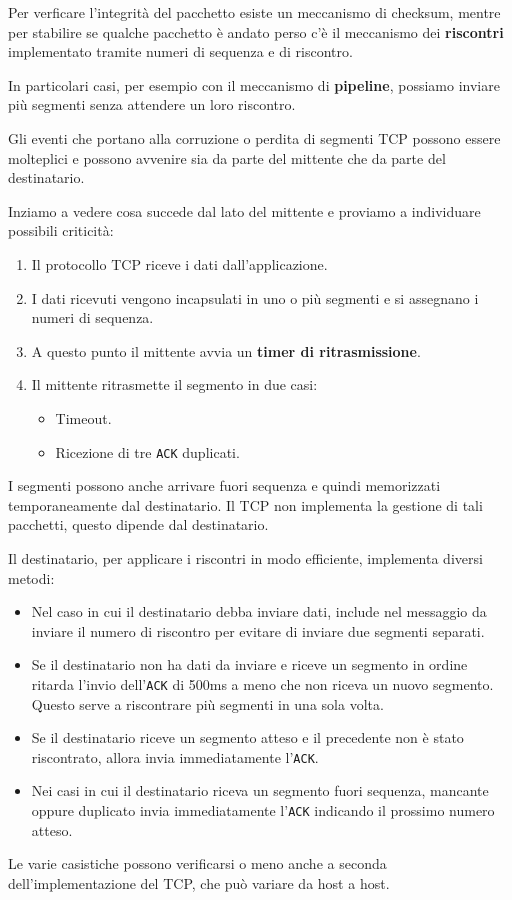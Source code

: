 Per verficare l'integrità del pacchetto esiste un meccanismo di checksum, mentre per stabilire se
qualche pacchetto è andato perso c'è il meccanismo dei \textbf{riscontri} implementato tramite
numeri di sequenza e di riscontro.

In particolari casi, per esempio con il meccanismo di \textbf{pipeline}, possiamo inviare più
segmenti senza attendere un loro riscontro.

Gli eventi che portano alla corruzione o perdita di segmenti TCP possono essere molteplici e
possono avvenire sia da parte del mittente che da parte del destinatario.

Inziamo a vedere cosa succede dal lato del mittente e proviamo a individuare possibili criticità:
\begin{enumerate}
	\item Il protocollo TCP riceve i dati dall'applicazione.
	\item I dati ricevuti vengono incapsulati in uno o più segmenti e si assegnano i numeri di
		sequenza.
	\item A questo punto il mittente avvia un \textbf{timer di ritrasmissione}.
	\item Il mittente ritrasmette il segmento in due casi:
		\begin{itemize}
			\item Timeout.
			\item Ricezione di tre \verb|ACK| duplicati.
		\end{itemize}
\end{enumerate}
I segmenti possono anche arrivare fuori sequenza e quindi memorizzati temporaneamente dal 
destinatario. Il TCP non implementa la gestione di tali pacchetti, questo dipende dal destinatario.

Il destinatario, per applicare i riscontri in modo efficiente, implementa diversi metodi:
\begin{itemize}
	\item Nel caso in cui il destinatario debba inviare dati, include nel messaggio da inviare
		il numero di riscontro per evitare di inviare due segmenti separati.
	\item Se il destinatario non ha dati da inviare e riceve un segmento in ordine ritarda l'invio
		dell'\verb|ACK| di 500ms a meno che non riceva un nuovo segmento. Questo serve a 
		riscontrare più segmenti in una sola volta.
	\item Se il destinatario riceve un segmento atteso e il precedente non è stato riscontrato,
		allora invia immediatamente l'\verb|ACK|.
	\item Nei casi in cui il destinatario riceva un segmento fuori sequenza, mancante oppure 
		duplicato invia immediatamente l'\verb|ACK| indicando il prossimo numero atteso.
\end{itemize}
Le varie casistiche possono verificarsi o meno anche a seconda dell'implementazione del TCP, che
può variare da host a host.

